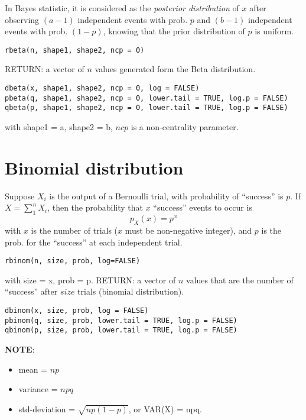 In Bayes statistic, it is considered as the {\it posterior
  distribution} of $x$ after observing $(a-1)$ independent events with
prob. $p$ and $(b-1)$ independent events with prob. $(1-p)$, knowing
that the prior distribution of $p$ is uniform.


\begin{verbatim}
rbeta(n, shape1, shape2, ncp = 0)
\end{verbatim}
RETURN: a vector of $n$ values generated form the Beta distribution.

\begin{verbatim}
dbeta(x, shape1, shape2, ncp = 0, log = FALSE)
pbeta(q, shape1, shape2, ncp = 0, lower.tail = TRUE, log.p = FALSE)
qbeta(p, shape1, shape2, ncp = 0, lower.tail = TRUE, log.p = FALSE)
\end{verbatim}
with shape1 = a, shape2 = b, $ncp$ is a non-centrality parameter.

\section{Binomial distribution}
\label{sec:binom-distr}
\label{sec:Binomial-distribution}


Suppose $X_i$ is the output of a Bernoulli trial, with probability of
``success'' is $p$. If $X=\sum_1^n X_i$, then the probability that $x$
``success'' events to occur is
\begin{equation}
  \label{eq:3}
  p_X(x) = p^x
\end{equation}
with $x$ is the number of trials ($x$ must be non-negative integer),
and $p$ is the prob. for the ``success'' at each independent trial.

\begin{lstlisting}
rbinom(n, size, prob, log=FALSE)
\end{lstlisting}
with size = x, prob = p.
RETURN: a vector of $n$ values that are the number of ``success''
after $size$ trials (binomial distribution).

\begin{lstlisting}
dbinom(x, size, prob, log = FALSE)
pbinom(q, size, prob, lower.tail = TRUE, log.p = FALSE)
qbinom(p, size, prob, lower.tail = TRUE, log.p = FALSE)
\end{lstlisting}

{\bf NOTE}:
\begin{itemize}
\item mean = $np$
\item variance = $npq$
\item std-deviation = $\sqrt{np(1-p)}$, or VAR(X) = npq.
\end{itemize}

